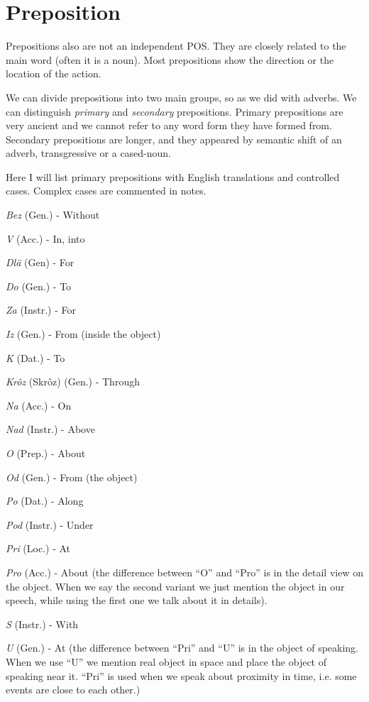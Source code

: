 \section{Preposition}

Prepositions also are not an independent POS. They are closely related to the main word (often it is a noun). Most prepositions show the direction or the location of the action. 

We can divide prepositions into two main groups, so as we did with adverbs. We can distinguish \textit{primary} and \textit{secondary} prepositions. Primary prepositions are very ancient and we cannot refer to any word form they have formed from. Secondary prepositions are longer, and they appeared by semantic shift of an adverb, transgressive or a cased-noun. 

Here I will list primary prepositions with English translations and controlled cases. Complex cases are commented in notes.

\textit{Bez} (Gen.) - Without

\textit{V} (Acc.) - In, into

\textit{Dlä} (Gen) - For

\textit{Do} (Gen.) - To

\textit{Za} (Instr.) - For

\textit{Iz} (Gen.) - From (inside the object)

\textit{K} (Dat.) - To

\textit{Krôz} (Skrôz) (Gen.) - Through

\textit{Na} (Acc.) - On

\textit{Nad} (Instr.) - Above

\textit{O} (Prep.) - About

\textit{Od} (Gen.) - From (the object)

\textit{Po} (Dat.) - Along

\textit{Pod} (Instr.) - Under

\textit{Pri} (Loc.) - At

\textit{Pro} (Acc.) - About (the difference between “O” and “Pro” is in the detail view on the object. When we say the second variant we just mention the object in our speech, while using the first one we talk about it in details).

\textit{S} (Instr.) - With

\textit{U} (Gen.) - At (the difference between “Pri” and “U” is in the object of speaking. When we use “U” we mention real object in space and place the object of speaking near it. “Pri” is used when we speak about proximity in time, i.e. some events are close to each other.)

